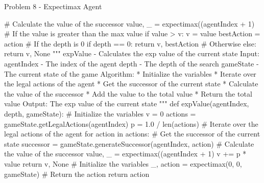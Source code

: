 \begin{problem}{Problem 8 - Expectimax Agent}
\begin{highlight}[Solution]
\begin{code}[Python]
                # Calculate the value of the successor
                value, _ = expectimax((agentIndex + 1) %
                # If the value is greater than the max value
                if value > v:
                    v = value
                    bestAction = action
            # If the depth is 0
            if depth == 0:
                return v, bestAction
            # Otherwise
            else:
                return v, None
        """ expValue - Calculates the exp value of the current state
                Input:
                agentIndex - The index of the agent
                depth - The depth of the search
                gameState - The current state of the game
                Algorithm:
                * Initialize the variables
                * Iterate over the legal actions of the agent
                    * Get the successor of the current state
                    * Calculate the value of the successor
                    * Add the value to the total value
                * Return the total value
                Output:
                The exp value of the current state
        """
        def expValue(agentIndex, depth, gameState):
            # Initialize the variables
            v = 0
            actions = gameState.getLegalActions(agentIndex)
            p = 1.0 / len(actions)
            # Iterate over the legal actions of the agent
            for action in actions:
                # Get the successor of the current state
                successor = gameState.generateSuccessor(agentIndex, action)
                # Calculate the value of the successor
                value, _ = expectimax((agentIndex + 1) %
                v += p * value
            return v, None
        # Initialize the variables
        _, action = expectimax(0, 0, gameState)
        # Return the action
        return action
    \end{code}
    \end{highlight}
\end{problem}

